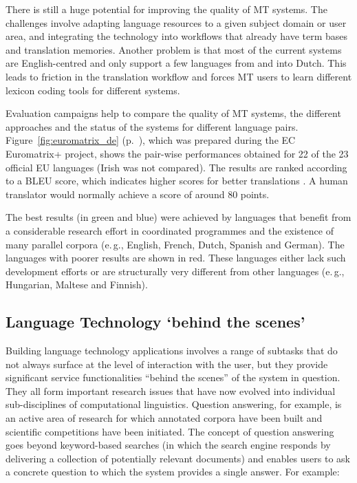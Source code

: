 \documentclass[]{../../metanetpaper}
\begin{document}
\begin{multicols}{2}
There is still a huge potential for improving the quality of MT systems. The challenges involve adapting language resources to a given subject domain or user area, and integrating the technology into workflows that already have term bases and translation memories. Another problem is that most of the current systems are English-centred and only support a few languages from and into Dutch. This leads to friction in the translation workflow and forces MT users to learn different lexicon coding tools for different systems.

Evaluation campaigns help to compare the quality of MT systems, the different approaches and the status of the systems for different language pairs. Figure~\ref{fig:euromatrix_de} (p.~\pageref{fig:euromatrix_de}), which was prepared during the EC Euromatrix+ project, shows the pair-wise performances obtained for 22 of the 23 official EU languages (Irish was not compared). The results are ranked according to a BLEU score, which indicates higher scores for better translations \cite{bleu1}. A human translator would normally achieve a score of around 80 points.

The best results (in green and blue) were achieved by languages that benefit from a considerable research effort in coordinated programmes and the existence of many parallel corpora (e.\,g., English, French, Dutch, Spanish and German). The languages with poorer results are shown in red. These languages either lack such development efforts or are structurally very different from other languages (e.\,g., Hungarian, Maltese and Finnish).

\subsection{Language Technology `behind the scenes'}

Building language technology applications involves a range of subtasks that do not always surface at the level of interaction with the user, but they provide significant service functionalities “behind the scenes” of the system in question. They all form important research issues that have now evolved into individual sub-disciplines of computational linguistics.  Question answering, for example, is an active area of research for which annotated corpora have been built and scientific competitions have been initiated. The concept of question answering goes beyond keyword-based searches (in which the search engine responds by delivering a collection of potentially relevant documents) and enables users to ask a concrete question to which the system provides a single answer. For example:


\end{multicols}
\end{document}
